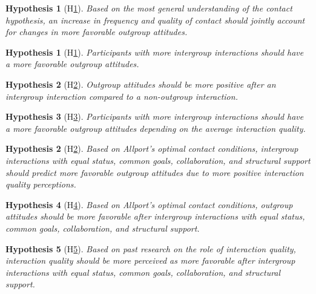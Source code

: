 \documentclass[man, 12pt, a4paper, mask]{apa7}
\theoremstyle{break}
\theoremstyle{plain}
\newtheorem{hyp}{Hypothesis}
\newtheorem{subhyp}{Hypothesis}
\begin{document}
\begin{hyp}[H\ref{hyp:contact}] \label{hyp:contact}
Based on the most general understanding of the contact hypothesis, an increase in frequency and quality of contact should jointly account for changes in more favorable outgroup attitudes.
\end{hyp}

\begin{subhyp}[H\ref{hyp:contactFreq}] \label{hyp:contactFreq}
\addtolength{\leftskip}{2.5em}
Participants with more intergroup interactions should have a more favorable outgroup attitudes.
\end{subhyp}

\begin{subhyp}[H\ref{hyp:contactDummy}] \label{hyp:contactDummy}
\addtolength{\leftskip}{2.5em}
Outgroup attitudes should be more positive after an intergroup interaction compared to a non-outgroup interaction.
\end{subhyp}

\begin{subhyp}[H\ref{hyp:contactFreqQual}] \label{hyp:contactFreqQual}
\addtolength{\leftskip}{2.5em}
Participants with more intergroup interactions should have a more favorable outgroup attitudes depending on the average interaction quality.
\end{subhyp}

\begin{hyp}[H\ref{hyp:AllportsConditions}] \label{hyp:AllportsConditions}
Based on Allport's optimal contact conditions, intergroup interactions with equal status, common goals, collaboration, and structural support should predict more favorable outgroup attitudes due to more positive interaction quality perceptions.
\end{hyp}

\setcounter{subhyp}{0}
\begin{subhyp}[H\ref{hyp:AllportsPred}] \label{hyp:AllportsPred}
\addtolength{\leftskip}{2.5em}
Based on Allport's optimal contact conditions, outgroup attitudes should be more favorable after intergroup interactions with equal status, common goals, collaboration, and structural support.
\end{subhyp}

\begin{subhyp}[H\ref{hyp:AllportsQuality}] \label{hyp:AllportsQuality}
\addtolength{\leftskip}{2.5em}
Based on past research on the role of interaction quality, interaction quality should be more perceived as more favorable after intergroup interactions with equal status, common goals, collaboration, and structural support.
\end{subhyp}
\end{document}
